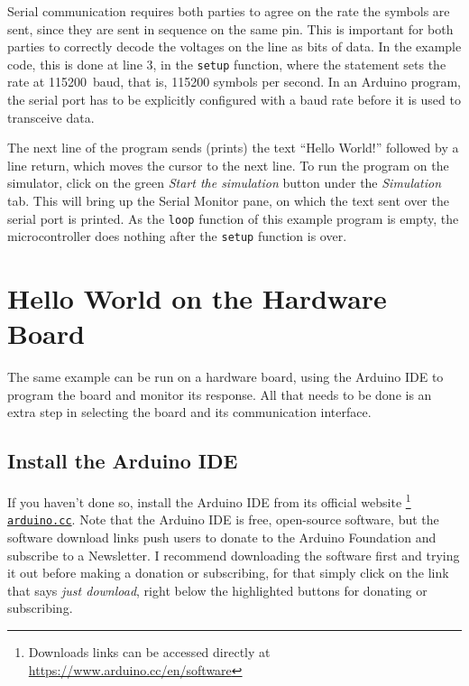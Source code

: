 Serial communication requires both parties to agree on the rate the symbols are sent, since they are sent in sequence on the same pin.
This is important for both parties to correctly decode the voltages on the line as bits of data.
In the example code, this is done at line 3, in the \texttt{setup} function, where the statement  sets the rate at \SI{115200}{baud}, that is, \num{115200} symbols per second.
In an Arduino program, the serial port has to be explicitly configured with a baud rate before it is used to transceive data.

The next line of the program sends (prints) the text ``Hello World!'' followed by a line return, which moves the cursor to the next line.
To run the program on the simulator, click on the green \emph{Start the simulation} button under the \emph{Simulation} tab.
This will bring up the Serial Monitor pane, on which the text sent over the serial port is printed.
As the \texttt{loop} function of this example program is empty, the microcontroller does nothing after the \texttt{setup} function is over.

\section{Hello World on the Hardware Board}

The same example can be run on a hardware board, using the Arduino IDE to program the board and monitor its response.
All that needs to be done is an extra step in selecting the board and its communication interface.

\subsection{Install the Arduino IDE}
If you haven't done so, install the Arduino IDE from its official website%
\footnote{Downloads links can be accessed directly at \url{https://www.arduino.cc/en/software}}
\texttt{\href{https://www.arduino.cc/en/software}{arduino.cc}}.
Note that the Arduino IDE is free, open-source software, but the software download links push users to donate to the Arduino Foundation and subscribe to a Newsletter.
I recommend downloading the software first and trying it out before making a donation or subscribing, for that simply click on the link that says \emph{just download}, right below the highlighted buttons for donating or subscribing.


